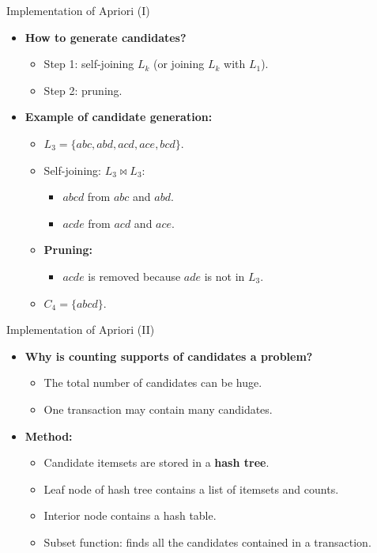\begin{frame}{Implementation of Apriori (I)}
	\begin{itemize}
		\item \textbf{\color{airforceblue}How to generate candidates?}
		      \begin{itemize}
			      \item Step 1: self-joining $L_k$ (or joining $L_k$ with $L_1$).
			      \item Step 2: pruning.
		      \end{itemize}
		\item \textbf{Example of candidate generation:}
		      \begin{itemize}
			      \item $L_3 = \{abc, abd, acd, ace, bcd\}$.
			      \item Self-joining: $L_3 \bowtie L_3$:
			            \begin{itemize}
				            \item $abcd$ from $abc$ and $abd$.
				            \item $acde$ from $acd$ and $ace$.
			            \end{itemize}
			      \item \textbf{Pruning:}
			            \begin{itemize}
				            \item $acde$ is removed because $ade$ is not in $L_3$.
			            \end{itemize}
			      \item $C_4 = \{abcd\}$.
		      \end{itemize}
	\end{itemize}
\end{frame}

\begin{frame}{Implementation of Apriori (II)}
	\begin{itemize}
		\item \textbf{Why is counting supports of candidates a problem?}
		      \begin{itemize}
			      \item The total number of candidates can be huge.
			      \item One transaction may contain many candidates.
		      \end{itemize}
		\item \textbf{Method:}
		      \begin{itemize}
			      \item Candidate itemsets are stored in a \textbf{hash tree}.
			      \item Leaf node of hash tree contains a list of itemsets and counts.
			      \item Interior node contains a hash table.
			      \item Subset function: finds all the candidates contained in a
			            transaction.
		      \end{itemize}
	\end{itemize}
\end{frame}

